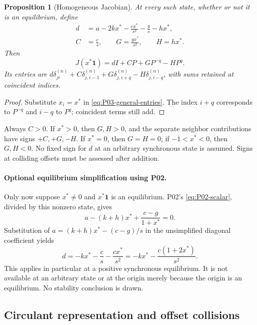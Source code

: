 \documentclass[11pt]{article}
\newcommand{\one}{\mathbf{1}}
\newtheorem{proposition}[theorem]{Proposition}
\theoremstyle{definition}
\theoremstyle{remark}
\begin{document}
\begin{proposition}[Homogeneous Jacobian]
\label{prop:P03-homogeneous}
At every such state, whether or not it is an equilibrium, define
\begin{align}
 d&=a-2kx^*-\frac{c x^*}{s^2}-\frac{g}{s}-h x^*,
       \label{eq:P03-d}\\
 C&=\frac{c}{s},\qquad G=\frac{g x^*}{s^2},\qquad H=h x^*.
       \label{eq:P03-CGH}
\end{align}
Then
\begin{equation}
 \boxed{J(x^*\one)=dI+CP+GP^{-q}-HP^q.}
 \label{eq:P03-homogeneous}
\end{equation}
Its entries are
$d\delta^{(n)}_{ji}+C\delta^{(n)}_{j,i-1}
+G\delta^{(n)}_{j,i+q}-H\delta^{(n)}_{j,i-q}$,
with sums retained at coincident indices.
\end{proposition}
\begin{proof}
Substitute $x_i=x^*$ in \eqref{eq:P03-general-entries}.
The index $i+q$ corresponds to $P^{-q}$ and $i-q$ to $P^q$;
coincident terms still add.
\end{proof}

Always $C>0$. If $x^*>0$, then $G,H>0$, and the separate
neighbor contributions have signs $+C,+G,-H$. If $x^*=0$,
then $G=H=0$; if $-1<x^*<0$, then $G,H<0$.
No fixed sign for $d$ at an arbitrary synchronous state is assumed.
Signs at colliding offsets must be assessed after addition.

\paragraph{Optional equilibrium simplification using P02.}
Only now suppose $x^*\ne0$ and $x^*\one$ is an equilibrium.
P02's \eqref{eq:P02-scalar}, divided by this nonzero state, gives
\begin{equation}
 a-(k+h)x^*+\frac{c-g}{1+x^*}=0.
 \label{eq:P03-equilibrium-relation}
\end{equation}
Substitution of $a=(k+h)x^*-(c-g)/s$ in the unsimplified
 diagonal coefficient yields
\begin{equation}
 d=-k x^*-\frac{c}{s}-\frac{c x^*}{s^2}
   =-k x^*-\frac{c(1+2x^*)}{s^2}.
 \label{eq:P03-equilibrium-d}
\end{equation}
This applies in particular at a positive synchronous equilibrium.
It is not available at an arbitrary state or at the origin merely
because the origin is an equilibrium. No stability conclusion is drawn.

\subsection{Circulant representation and offset collisions}
\end{document}
